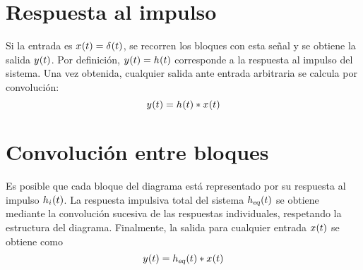\section{Respuesta al impulso}

Si la entrada es $\fx[x]{t} = \fx[\delta]{t}$, se recorren los bloques con esta señal y se obtiene la salida $\fx[y]{t}$.
Por definición, $\fx[y]{t} = \fx[h]{t}$ corresponde a la respuesta al impulso del sistema.
Una vez obtenida, cualquier salida ante entrada arbitraria se calcula por convolución:
\[
    \fx[y]{t} = \fx[h]{t} * \fx[x]{t}
\]

\section{Convolución entre bloques}

Es posible que cada bloque del diagrama está representado por su respuesta al impulso $\fx[h_\ith]{t}$.
La respuesta impulsiva total del sistema $\fx[\sub{h}{eq}]{t}$ se obtiene mediante la convolución sucesiva de las respuestas individuales, respetando la estructura del diagrama.
Finalmente, la salida para cualquier entrada $\fx[x]{t}$ se obtiene como
\[
    \fx[y]{t} = \fx[\sub{h}{eq}]{t} * \fx[x]{t}
\]